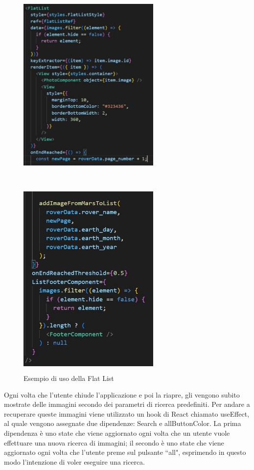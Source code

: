 \begin{figure}[h]
    \centering
    \includegraphics[width=7cm, height=10cm]{images/FlatListPrimaParte.jpg}
    \label{fig:FlatListPrimaParte}
\end{figure}

\begin{figure}[h]
    \centering
    \includegraphics[width=7cm, height=10cm]{images/FlatListSecondaParte.jpg}
    \caption[differenzeiteot]{Esempio di uso della Flat List}
    \label{fig:FlatListSecondaParte}
\end{figure}

Ogni volta che l'utente chiude l'applicazione e poi la riapre, gli vengono subito mostrate delle immagini secondo dei parametri di ricerca predefiniti. Per andare a recuperare queste immagini
viene utilizzato un hook di React chiamato useEffect, al quale vengono assegnate due dipendenze: Search e allButtonColor. La prima dipendenza \`e uno state
che viene aggiornato ogni volta che un utente vuole effettuare una nuova ricerca di immagini; il secondo \`e uno state che viene aggiornato ogni volta che l'utente preme sul
pulsante ``all", esprimendo in questo modo l'intenzione di voler eseguire una ricerca.


